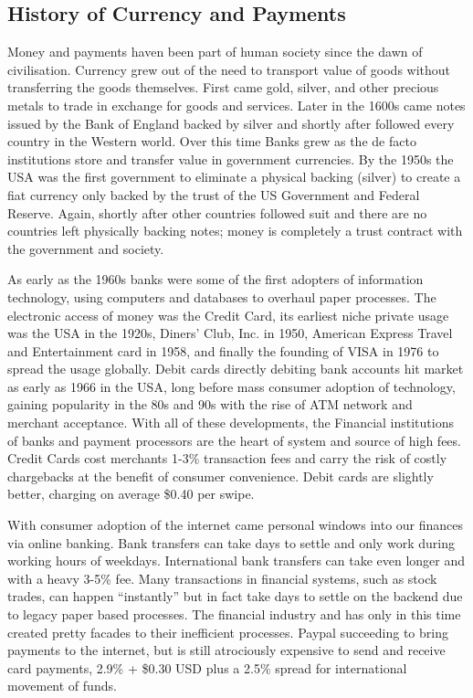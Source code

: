 \documentclass[12pt]{article} %
\begin{document}
\subsection{History of Currency and Payments}
Money and payments haven been part of human society since the dawn of civilisation. Currency grew out of the need to transport value of goods without transferring the goods themselves. First came gold, silver, and other precious metals to trade in exchange for goods and services. Later in the 1600s came notes issued by the Bank of England backed by silver and shortly after followed every country in the Western world. Over this time Banks grew as the de facto institutions store and transfer value in government currencies. By the 1950s the USA was the first government to eliminate a physical backing (silver) to create a fiat currency only backed by the trust of the US Government and Federal Reserve. Again, shortly after other countries followed suit and there are no countries left physically backing notes; money is completely a trust contract with the government and society.

As early as the 1960s banks were some of the first adopters of information technology, using computers and databases to overhaul paper processes. The electronic access of money was the Credit Card, its earliest niche private usage was the USA in the 1920s, Diners’ Club, Inc. in 1950, American Express Travel and Entertainment card in 1958, and finally the founding of VISA in 1976 to spread the usage globally\cite{britannica2016creditcard}. Debit cards directly debiting bank accounts hit market as early as 1966 in the USA, long before mass consumer adoption of technology, gaining popularity in the 80s and 90s with the rise of ATM network and merchant acceptance\cite{collins2011debitcard}. With all of these developments, the Financial institutions of banks and payment processors are the heart of system and source of high fees. Credit Cards cost  merchants 1-3\% transaction fees and carry the risk of costly chargebacks at the benefit of consumer convenience. Debit cards are slightly better, charging on average \$0.40 per swipe. 

With consumer adoption of the internet came personal windows into our finances via online banking. Bank transfers can take days to settle and only work during working hours of weekdays. International bank transfers can take even longer and with a heavy 3-5\% fee.  Many transactions in financial systems, such as stock trades, can happen ``instantly'' but in fact take days to settle on the backend due to legacy paper based processes.  The financial industry and has only in this time created pretty facades to their inefficient processes. Paypal succeeding to bring payments to the internet, but is still atrociously expensive to send and receive card payments, 2.9\% + \$0.30 USD plus a 2.5\% spread for international movement of funds\cite{paypal2017fees}.
\end{document}
